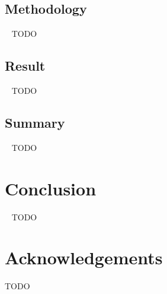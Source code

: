 \documentclass[9pt,conference]{IEEEtran}
\begin{document}
    \subsection{Methodology}~\label{section:case_methodology}
    TODO

    \subsection{Result}~\label{section:case_result}
    TODO

    \subsection{Summary}~\label{section:case_summary}
    TODO

    \section{Conclusion}~\label{section:conclusion}
    TODO

    \section*{Acknowledgements}
    TODO

    
    
\end{document}
